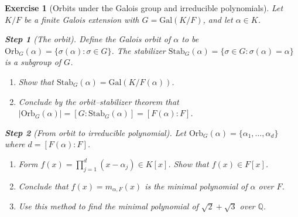 \documentclass{article}
\newtheorem{exer}{Exercise}
\newcommand{\Q}{\mathbb{Q}}
\begin{document}
\begin{exer}[Orbits under the Galois group and irreducible polynomials]\label{exer:orbit-irred}
Let $K/F$ be a finite Galois extension with $G=\mathrm{Gal}(K/F)$, and let $\alpha\in K$.

\medskip
\noindent\textbf{Step 1} (The orbit).\;
Define the \emph{Galois orbit} of $\alpha$ to be $\mathrm{Orb}_G(\alpha)=\{\sigma(\alpha):\sigma\in G\}$. The stabilizer $\mathrm{Stab}_G(\alpha)=\{\sigma\in G:\sigma(\alpha)=\alpha\}$ is a subgroup of $G$.
\begin{enumerate}
\item[(a)] Show that $\mathrm{Stab}_G(\alpha) = \mathrm{Gal}(K/F(\alpha))$.
\item[(b)] Conclude by the orbit--stabilizer theorem that $|\mathrm{Orb}_G(\alpha)| = [G:\mathrm{Stab}_G(\alpha)] = [F(\alpha):F]$.
\end{enumerate}

\medskip
\noindent\textbf{Step 2} (From orbit to irreducible polynomial).\;
Let $\mathrm{Orb}_G(\alpha)=\{\alpha_1,\dots,\alpha_d\}$ where $d=[F(\alpha):F]$.
\begin{enumerate}
\item[(a)] Form $f(x)=\prod_{j=1}^{d}(x-\alpha_j)\in K[x]$. Show that $f(x)\in F[x]$.
\item[(b)] Conclude that $f(x)=m_{\alpha,F}(x)$ is the minimal polynomial of $\alpha$ over $F$.
\item[(c)] Use this method to find the minimal polynomial of $\sqrt{2}+\sqrt{3}$ over $\Q$. 
\end{enumerate}

\end{exer}
\end{document}
